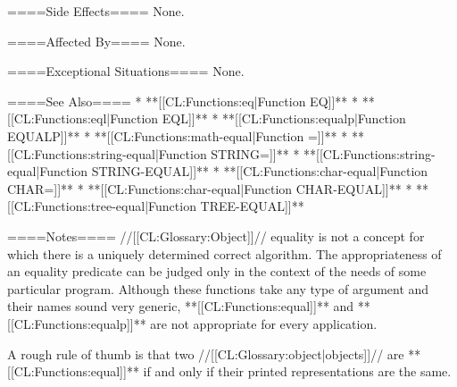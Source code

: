 ====Side Effects====
None.

====Affected By====
None.

====Exceptional Situations====
None.

====See Also====
  * **[[CL:Functions:eq|Function EQ]]**
  * **[[CL:Functions:eql|Function EQL]]**
  * **[[CL:Functions:equalp|Function EQUALP]]**
  * **[[CL:Functions:math-equal|Function =]]**
  * **[[CL:Functions:string-equal|Function STRING=]]**
  * **[[CL:Functions:string-equal|Function STRING-EQUAL]]**
  * **[[CL:Functions:char-equal|Function CHAR=]]**
  * **[[CL:Functions:char-equal|Function CHAR-EQUAL]]**
  * **[[CL:Functions:tree-equal|Function TREE-EQUAL]]**

====Notes====
//[[CL:Glossary:Object]]// equality is not a concept for which there is a uniquely determined correct algorithm. The appropriateness of an equality predicate can be judged only in the context of the needs of some particular program. Although these functions take any type of argument and their names sound very generic, **[[CL:Functions:equal]]** and **[[CL:Functions:equalp]]** are not appropriate for every application.


A rough rule of thumb is that two //[[CL:Glossary:object|objects]]// are **[[CL:Functions:equal]]** if and only if their printed representations are the same.



  
